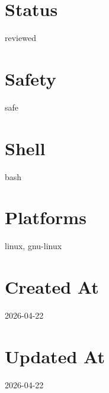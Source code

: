 \documentclass{article}
\begin{document}
\section*{Status}
reviewed

\section*{Safety}
safe

\section*{Shell}
bash

\section*{Platforms}
linux, gnu-linux

\section*{Created At}
2026-04-22

\section*{Updated At}
2026-04-22
\end{document}
